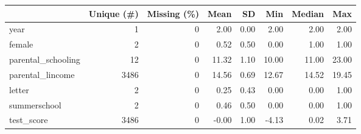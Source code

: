\begin{table}[H]
\centering
\begin{tabular}[t]{lrrrrrrr}
\toprule
  & Unique (\#) & Missing (\%) & Mean & SD & Min & Median & Max\\
\midrule
year & 1 & 0 & 2.00 & 0.00 & 2.00 & 2.00 & 2.00\\
female & 2 & 0 & 0.52 & 0.50 & 0.00 & 1.00 & 1.00\\
parental\_schooling & 12 & 0 & 11.32 & 1.10 & 10.00 & 11.00 & 23.00\\
parental\_lincome & 3486 & 0 & 14.56 & 0.69 & 12.67 & 14.52 & 19.45\\
letter & 2 & 0 & 0.25 & 0.43 & 0.00 & 0.00 & 1.00\\
summerschool & 2 & 0 & 0.46 & 0.50 & 0.00 & 0.00 & 1.00\\
test\_score & 3486 & 0 & -0.00 & 1.00 & -4.13 & 0.02 & 3.71\\
\bottomrule
\end{tabular}
\end{table}
